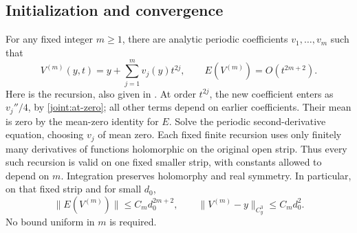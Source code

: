 \subsection{Initialization and convergence}

For any fixed integer \(m\ge1\), there are analytic periodic
coefficients \(v_1,\ldots,v_m\) such that
\begin{equation}
 V^{(m)}(y,t)=y+\sum_{j=1}^m v_j(y)t^{2j},\qquad
 E(V^{(m)})=O(t^{2m+2}).
 \label{joint:initializer}
\end{equation}
Here is the recursion, also given in \cite[Lemma~3.6]{NB}.
At order \(t^{2j}\), the new coefficient enters as \(v_j''/4\), by
\eqref{joint:at-zero}; all other terms depend on earlier coefficients.
Their mean is zero by the mean-zero identity for \(E\).  Solve the
periodic second-derivative equation, choosing \(v_j\) of mean zero.
Each fixed finite recursion uses only finitely many derivatives of
functions holomorphic on the original open strip.  Thus every such
recursion is valid on one fixed smaller strip, with constants allowed
to depend on \(m\).  Integration preserves holomorphy and real symmetry.
In particular, on that fixed strip and for small \(d_0\),
\[
 \|E(V^{(m)})\|\le C_m d_0^{2m+2},\qquad
 \|V^{(m)}-y\|_{C_y^3}\le C_m d_0^2.
\]
No bound uniform in \(m\) is required.

